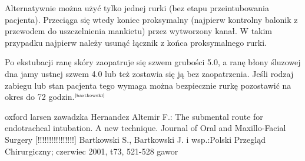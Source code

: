 \documentclass[a4paper, 12pt]{report}
\newcommand\cyt[1]{$^{\tiny{\cite{#1}}}$}
\begin{document}
Alternatywnie można użyć tylko jednej rurki (bez etapu
przeintubowania pacjenta). Przeciąga się wtedy koniec proksymalny
(najpierw kontrolny balonik z przewodem do uszczelnienia mankietu)
przez wytworzony kanał. W takim przypadku najpierw należy usunąć
łącznik z końca proksymalnego rurki.

Po ekstubacji ranę skóry zaopatruje się szwem grubości 5.0, a ranę
błony śluzowej dna jamy ustnej szwem 4.0 lub też zostawia się ją bez
zaopatrzenia. Jeśli rodzaj zabiegu lub stan pacjenta tego wymaga można
bezpiecznie rurkę pozostawić na okres do 72 godzin.\cyt{bartkowski}

\begin{thebibliography}{99}
 oxford
 larsen
 zawadzka
 Hernandez Altemir F.: The submental route for
  endotracheal intubation. A new technique. Journal of Oral and
  Maxillo-Facial Surgery [!!!!!!!!!!!!!!!!]
 Bartkowski S., Bartkowski J. i wsp.:Polski
  Przegląd Chirurgiczny; czerwiec 2001, t73, 521-528
 gawor
\end{thebibliography}
\end{document}
